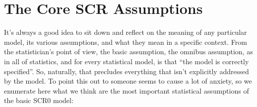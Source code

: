 \section{The Core SCR Assumptions}

It's always a good idea to sit down and reflect on the meaning of any
particular model, its various assumptions, and what they mean in a
specific context.  From the statistician's point of view, the basic
assumption, the omnibus assumption, as in all of statistics, and for
every statistical model, is that ``the model is correctly
specified''. So, naturally, that precludes everything that isn't
explicitly addressed by the model.  To point this out to someone seems
to cause a lot of anxiety, so we enumerate here what we think are the
most important statistical assumptions of the basic SCR0 model:

